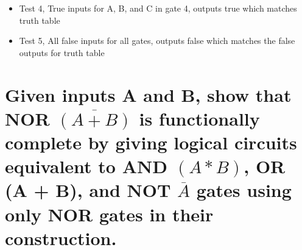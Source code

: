 \documentclass{article}
\begin{document}
\begin{itemize}
    \item Test 4, True inputs for A, B, and C in gate 4, outputs true which matches truth table \newline
    \newline
    
    \item Test 5, All false inputs for all gates, outputs false which matches the false outputs for truth table \newline
    \newline
\end{itemize}

\section{Given inputs A and B, show that NOR $\overline{(A + B)}$ is functionally complete by giving logical
circuits equivalent to AND ${(A * B)}$, OR {(A + B)}, and NOT $\overline{A}$ gates using only NOR
gates in their construction.
}
\large
\end{document}
